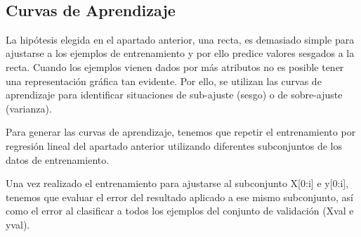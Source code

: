 \documentclass[11pt]{article}
\begin{document}
    \begin{center}
    \end{center}
    { \hspace*{\fill} \\}
    
    \subsection{Curvas de Aprendizaje}\label{curvas-de-aprendizaje}

    La hipótesis elegida en el apartado anterior, una recta, es demasiado
simple para ajustarse a los ejemplos de entrenamiento y por ello predice
valores sesgados a la recta. Cuando los ejemplos vienen dados por más
atributos no es posible tener una representación gráfica tan evidente.
Por ello, se utilizan las curvas de aprendizaje para identificar
situaciones de sub-ajuste (sesgo) o de sobre-ajuste (varianza).

Para generar las curvas de aprendizaje, tenemos que repetir el
entrenamiento por regresión lineal del apartado anterior utilizando
diferentes subconjuntos de los datos de entrenamiento.

Una vez realizado el entrenamiento para ajustarse al subconjunto
X{[}0:i{]} e y{[}0:i{]}, tenemos que evaluar el error del resultado
aplicado a ese mismo subconjunto, así como el error al clasificar a
todos los ejemplos del conjunto de validación (Xval e yval).
\end{document}
